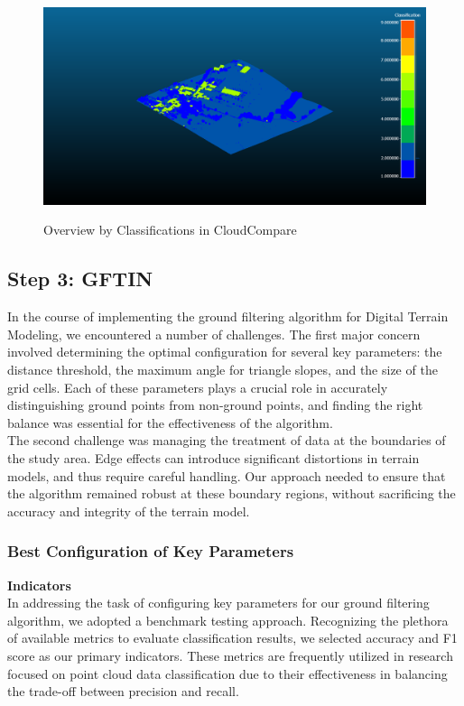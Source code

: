 \documentclass{article}
\begin{document}
\vspace{1cm}

\begin{figure}[hbt!]
    \centering
    \includegraphics[width=0.6\linewidth]{Figures/classes_3d.png}
  \label{fig:3d_classes}
  \caption{Overview by Classifications in CloudCompare}
\end{figure}


\subsection{Step 3: GFTIN}\label{step3}

In the course of implementing the ground filtering algorithm for Digital Terrain Modeling, we encountered a number of challenges. The first major concern involved determining the optimal configuration for several key parameters: the distance threshold, the maximum angle for triangle slopes, and the size of the grid cells. Each of these parameters plays a crucial role in accurately distinguishing ground points from non-ground points, and finding the right balance was essential for the effectiveness of the algorithm.\\

\noindent The second challenge was managing the treatment of data at the boundaries of the study area. Edge effects can introduce significant distortions in terrain models, and thus require careful handling. Our approach needed to ensure that the algorithm remained robust at these boundary regions, without sacrificing the accuracy and integrity of the terrain model.


\subsubsection{Best Configuration of Key Parameters}
\textbf{Indicators}\\
\noindent In addressing the task of configuring key parameters for our ground filtering algorithm, we adopted a benchmark testing approach. Recognizing the plethora of available metrics to evaluate classification results, we selected accuracy and F1 score as our primary indicators. These metrics are frequently utilized in research focused on point cloud data classification due to their effectiveness in balancing the trade-off between precision and recall.\\
\end{document}
